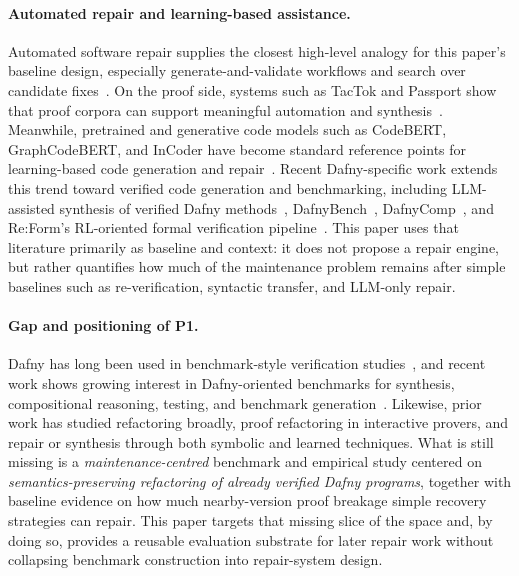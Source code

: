 \paragraph{Automated repair and learning-based assistance.}
Automated software repair supplies the closest high-level analogy for this paper's baseline design, especially generate-and-validate workflows and search over candidate fixes~\cite{Gazzola2017AutomaticSoftwareRepair,Xia2023APRWithPLM}. On the proof side, systems such as TacTok and Passport show that proof corpora can support meaningful automation and synthesis~\cite{First2020TacTok,SanchezStern2023Passport}. Meanwhile, pretrained and generative code models such as CodeBERT, GraphCodeBERT, and InCoder have become standard reference points for learning-based code generation and repair~\cite{Feng2020CodeBERT,Guo2020GraphCodeBERT,Fried2022InCoder}. Recent Dafny-specific work extends this trend toward verified code generation and benchmarking, including LLM-assisted synthesis of verified Dafny methods~\cite{Misu2024AIAssistedDafny}, DafnyBench~\cite{DafnyBench2024}, DafnyComp~\cite{Xu2026DafnyComp}, and Re:Form's RL-oriented formal verification pipeline~\cite{Yan2025ReFormDafny}. This paper uses that literature primarily as baseline and context: it does not propose a repair engine, but rather quantifies how much of the maintenance problem remains after simple baselines such as re-verification, syntactic transfer, and LLM-only repair.

\paragraph{Gap and positioning of P1.}
Dafny has long been used in benchmark-style verification studies~\cite{Leino2010Dafny,Leino2010VSTTEBenchmarks}, and recent work shows growing interest in Dafny-oriented benchmarks for synthesis, compositional reasoning, testing, and benchmark generation~\cite{DafnyBench2024,Wang2026TACoDafny,Xu2026DafnyComp}. Likewise, prior work has studied refactoring broadly, proof refactoring in interactive provers, and repair or synthesis through both symbolic and learned techniques. What is still missing is a \emph{maintenance-centred} benchmark and empirical study centered on \emph{semantics-preserving refactoring of already verified Dafny programs}, together with baseline evidence on how much nearby-version proof breakage simple recovery strategies can repair. This paper targets that missing slice of the space and, by doing so, provides a reusable evaluation substrate for later repair work without collapsing benchmark construction into repair-system design.
